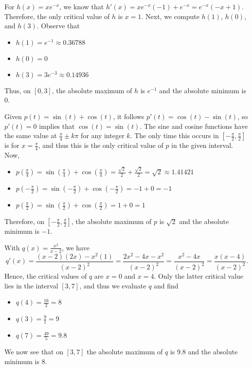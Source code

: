 \begin{activitySolution}
	\ba
	\item For $h(x) = xe^{-x}$, we know that $h'(x) = xe^{-x}(-1) + e^{-x} = e^{-x}(-x+1)$.  Therefore, the only critical value of $h$ is $x = 1$.  Next, we compute $h(1)$, $h(0)$, and $h(3)$.  Observe that 
	\begin{itemize}
	\item	$h(1) = e^{-1} \approx 0.36788$
	\item  $h(0) = 0$
	\item  $h(3) = 3e^{-3} \approx 0.14936$
	\end{itemize}
	Thus, on $[0,3]$, the absolute maximum of $h$ is $e^{-1}$ and the absolute minimum is $0$.
	\item Given $p(t) = \sin(t) + \cos(t)$, it follows $p'(t) = \cos(t) - \sin(t)$, so $p'(t) = 0$ implies that $\cos(t) =\sin(t)$.   The sine and cosine functions have the same value at $\frac{\pi}{4} \pm k\pi$ for any integer $k$.  The only time this occurs in $[-\frac{\pi}{2}, \frac{\pi}{2}]$ is for $x = \frac{\pi}{4}$, and thus this is the only critical value of $p$ in the given interval.  Now,
	\begin{itemize}
	\item	$p(\frac{\pi}{4}) = \sin(\frac{\pi}{4}) + \cos(\frac{\pi}{4}) = \frac{\sqrt{2}}{2} + \frac{\sqrt{2}}{2} = \sqrt{2} \approx 1.41421$
	\item $p(-\frac{\pi}{2}) = \sin(-\frac{\pi}{2}) + \cos(-\frac{\pi}{2}) = -1 + 0 = -1$
	\item  $p(\frac{\pi}{2}) = \sin(\frac{\pi}{2}) + \cos(\frac{\pi}{2}) = 1 + 0 = 1$
	\end{itemize}	
	Therefore, on $[-\frac{\pi}{2},\frac{\pi}{2}]$, the absolute maximum of $p$ is $\sqrt{2}$ and the absolute minimum is $-1$. 
	\item With $q(x) = \frac{x^2}{x-2}$, we have 
	$$q'(x) = \frac{(x-2)(2x) - x^2(1)}{(x-2)^2} = \frac{2x^2 - 4x - x^2}{(x-2)^2} = \frac{x^2-4x}{(x-2)^2} = \frac{x(x-4)}{(x-2)^2}.$$
	Hence, the critical values of $q$ are $x = 0$ and $x = 4$.  Only the latter critical value lies in the interval $[3,7]$, and thus we evaluate $q$ and find
	\begin{itemize}
	\item $q(4) = \frac{16}{2} = 8$
	\item $q(3) = \frac{9}{1} = 9$
	\item $q(7) = \frac{49}{5} = 9.8$
	\end{itemize} 
	We now see that on $[3,7]$ the absolute maximum of $q$ is 9.8 and the absolute minimum is 8.

\end{activitySolution}
